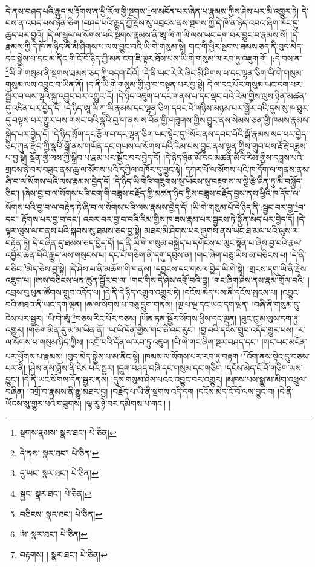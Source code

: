དེ་ནས་བཤད་པའི་རྒྱུད་མ་རྟོགས་ན་ཕྱི་རོལ་གྱི་སྔགས་\footnote{སྔགས་རྣམས་  སྣར་ཐང་།  པེ་ཅིན། }ལ་མངོན་པར་ཞེན་པ་རྣམས་ཀྱིས་ཤེས་པར་མི་འགྱུར་ཏེ། དེ་བས་ན་འབད་པས་ཉོན་ཅིག །བཤད་པའི་རྒྱུད་ཀྱི་རྗེས་སུ་འབྲངས་ནས་སྔགས་ཀྱི་དེ་ཁོ་ན་ཉིད་འབའ་ཞིག་ཁོང་དུ་ཆུད་པར་བྱའོ། །དེ་ལ་སྦྲུལ་ལ་སོགས་པའི་སྔགས་རྣམས་ནི་ཨཱ་ལི་ཀཱ་ལི་ལས་ཡང་དག་པར་བྱུང་བ་རྣམས་སོ། །དེ་རྣམས་ཀྱི་དེ་ཁོ་ན་ཉིད་ནི་མི་ཤིགས་པ་ལས་བྱུང་བའི་ཡི་གེ་གསུམ་སྟེ། གང་གི་ཕྱིར་སྔགས་ཐམས་ཅད་ནི་བུད་མེད་དང་སྐྱེས་པ་དང་མ་ནིང་གི་ངོ་བོ་ཉིད་ཀྱི་མན་ངག་ཇི་ལྟར་ཐོས་པས་ཡི་གེ་གསུམ་ལ་རབ་ཏུ་འཇུག་གོ། །:དེ་བས་ན་\footnote{དེ་ནས་  སྣར་ཐང་།  པེ་ཅིན། }ཡི་གེ་གསུམ་ནི་སྔགས་ཐམས་ཅད་ཀྱི་བདག་པོའོ། །དེ་ནི་ཡང་རེ་རེ་ཞིང་མི་ཤིགས་པ་དང་ལྷན་ཅིག་ཡི་གེ་གསུམ་གསུམ་ལས་འབྱུང་བ་ཡིན་ནོ། །ད་ནི་ཡི་གེ་གསུམ་གྱི་བྱ་བ་བསྟན་པར་བྱ་སྟེ། དེ་ལ་དང་པོར་གསུམ་ཡང་དག་པར་སྦྱོར་བ་ལས་ལྷའི་སྐུ་འབྱུང་བར་འགྱུར་རོ། །དེ་ཉིད་འཇུག་པ་དང་གནས་པ་དང་ལྡང་བའི་རིམ་གྱིས་ལུས་ཉིན་མཚན་དུ་འཛིན་པར་བྱེད་དོ། །དེ་ཉིད་ཨཱ་ལི་ཀཱ་ལི་རྣམས་དང་ལྷན་ཅིག་དབང་པོ་གཉིས་མཉམ་པར་སྦྱོར་བའི་དུས་སུ་ཁ་ཐུར་དུ་བལྟས་པར་གྱུར་པས་གསང་བའི་སྣའི་བུ་ག་ནས་ས་བོན་གྱི་གཟུགས་ཀྱིས་བྱུང་ནས་སེམས་ཅན་གྱི་ཁམས་རྣམས་སྐྱེད་པར་བྱེད་དོ། །དེ་ཉིད་སྲོག་དང་རྩོལ་བ་དང་ལྷན་ཅིག་ཡང་སྟེང་དུ་\footnote{དུ་ཡང་  སྣར་ཐང་།  པེ་ཅིན། }སོང་ནས་དབང་པོའི་སྒོ་རྣམས་སད་པར་བྱེད་ཅིང་ཀུན་རྫོབ་ཀྱི་སྣའི་སྒོ་ནས་གཡོན་དང་གཡས་ལ་སོགས་པའི་རིམ་པས་བྱུང་ནས་ལྷུན་གྱིས་གྲུབ་པས་རྡོ་རྗེ་བཟླས་པ་བྱ་སྟེ། སྔོན་གྱི་ལས་ཀྱི་སྒྲིབ་པ་རྣམ་པར་སྦྱོང་བར་བྱེད་དོ། །དེ་ཉིད་ཉིན་མོ་དང་མཚན་མོའི་རིམ་གྱིས་བཟླས་པའི་གྲངས་ཉེ་བར་བཟུང་ནས་ཆུ་ལ་སོགས་པའི་དཀྱིལ་འཁོར་དུ་བྱུང་སྟེ། དཀར་པོ་ལ་སོགས་པའི་ཁ་དོག་ལ་གནས་ནས་ཞི་བ་ལ་སོགས་པའི་ལས་རྣམས་བྱེད་དོ། །དེ་ཉིད་ཡི་གེའི་གཟུགས་སུ་ཡོངས་སུ་བརྟགས་ལ་ལྕེ་རྩེ་ཤིན་ཏུ་མི་བསྐྱོད་ཅིང་། །ཞེས་བྱ་བ་ལ་སོགས་པའི་ངག་གི་བཟླས་བརྗོད་ཀྱི་མཚན་ཉིད་ཀྱིས་བཟླས་བརྗོད་བྱས་ནས་ཕྱིའི་ཁ་དོག་ལ་སོགས་པའི་བྱ་བ་ལ་བརྟེན་ཏེ་ཞི་བ་ལ་སོགས་པའི་ལས་རྣམས་བྱེད་དོ། །ཡི་གེ་གསུམ་པོ་དེ་ཉིད་ནི་:སྦྱང་བར་བྱ་\footnote{སྦྱང་  སྣར་ཐང་།  པེ་ཅིན། }བ་དང་། རྟོགས་པར་བྱ་བ་དང་། འབར་བར་བྱ་བ་བའི་རིམ་གྱིས་ཁ་ཟས་རྣམ་པར་སྦྱངས་ཏེ་སྐྱོན་མེད་པར་བྱེད་དོ། །དེ་ལྟར་ལུས་ལ་གནས་པའི་སྐབས་སུ་ཐམས་ཅད་བྱ་སྟེ། མཐར་མི་ཤིགས་པར་ཞུགས་ནས་ཡང་ཐ་མལ་པའི་ལུས་ལ་བརྟེན་ཏེ། དེ་བཞིན་དུ་ཐམས་ཅད་བྱེད་དོ། །ད་ནི་ཡི་གེ་གསུམ་བསྐྱེད་པ་དགོངས་པ་ལུང་སྟོན་པ་ཞེས་བྱ་བའི་རྣལ་འབྱོར་ཆེན་པོའི་རྒྱུད་ལས་གསུངས་པ། དང་པོ་གཅིག་ནི་དགུ་དབུས་ན། །གང་ཞིག་བཅུ་ཡིས་མ་བཅིངས་པ། །དེ་ནི་བཅིང་\footnote{བཅིངས་  སྣར་ཐང་།  པེ་ཅིན། }མེད་ཅེས་བྱ་སྟེ། །དེ་ཤེས་པ་ནི་མཆོག་གི་གནས། །དབྱངས་དང་གསལ་བྱེད་ཡི་གེ་སྟེ། །གྲངས་དགུ་ཡི་ནི་རྗེས་འཇུག་པ། །ཨས་བཅིངས་ཕན་ཚུན་སྦྱོར་བ་ལ། །གང་གིས་དེ་ཤེས་འགྲོ་བའི་བླ། །གང་ཞིག་ཤེས་ནས་རྣམ་གྲོལ་བའི། །འབྲས་བུ་ཕུན་ཚོགས་གྲུབ་འདོད་པ། །དེ་ནི་དེ་ཉིད་འགྲུབ་འགྱུར་ཏེ། །དངོས་མེད་པས་ནི་དངོས་སྤངས་པ། །འབྱུང་བའི་མཐའ་ནི་ཡང་དག་ལྡན། །ཆ་ལ་སོགས་པ་བཅུ་དྲུག་གནས། །ལྔ་པ་ལྔ་དང་ཡང་དག་ལྡན། །བཞི་ནི་གསུམ་དུ་ངེས་པར་སྦྱར། །ཡི་གེ་ཨཱཾ་\footnote{ཨཾ་  སྣར་ཐང་།  པེ་ཅིན། }བཅས་རིང་པོར་བཅས། །ཡོན་ཏན་སྦྱོར་སོགས་ཕྱིས་དང་ལྡན། །ཐུང་ངུ་མ་ལུས་དག་ཏུ་འགྱུར། །གཅིག་མིན་དུ་མ་མ་ཡིན་ནོ། །ཡ་ཡི་དོན་གྱིས་གང་ཅི་འང་རུང་། །བྱ་བའི་དངོས་གྲུབ་འདོད་གྱུར་པས། །ར་ལ་སོགས་པ་གསུམ་ཉིད་ཀྱིས། །འགྲོ་བའི་དོན་ལ་རབ་ཏུ་འཇུག །ཡི་གེ་གང་ཞིག་སྔར་བཤད་དང་། །གང་ཡང་མངོན་པར་ཕྱོགས་པ་རྣམས། །བུད་མེད་སྐྱེས་པ་མ་ནིང་སྟེ། །ཁམས་ལ་སོགས་པར་རབ་ཏུ་བརྟག །\footnote{བརྟགས། །  སྣར་ཐང་།  པེ་ཅིན། }འོག་ནས་སྟེང་དུ་བཅས་པར་ནི། །ཤེས་ནས་བློས་ནི་ངེས་པར་སྦྱར། །དྲུག་བཤད་བཞི་དང་གསུམ་དང་གཅིག །དངོས་མེད་ངོ་བོ་གཅིག་ལས་བྱུང་། །དེ་ནི་ཡང་སོགས་དོན་སྦྱར་ནས། །དུས་གསུམ་ཤེས་པའང་འབྱུང་བར་འགྱུར། །མཁས་པས་སྒྱུ་མ་མིག་འཕྲུལ་བཞིན། །འགྲོ་བ་རྣམས་ནི་རྒྱུ་མཐར་བྱ། །བརྗོད་པ་ཡི་ནི་སྔགས་འདི་དག །དངོས་མེད་ངོ་བོ་ལས་བྱུང་བ། །དེ་ནི་ཡོངས་སུ་གྱུར་པའི་གཟུགས། །ལྷ་རུ་ཉེ་བར་དམིགས་པ་གང་། །

